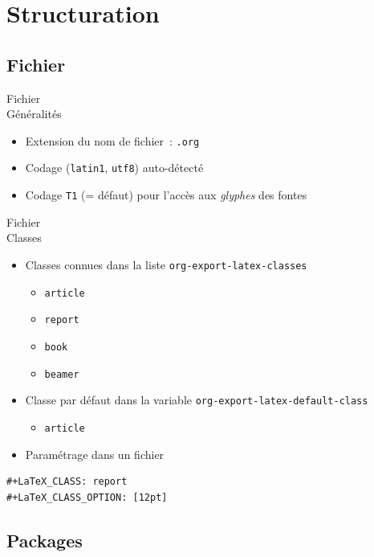 \documentclass[presentation,t,hideothersubsections]{beamer}
\begin{document}
\section{Structuration}
\label{sec-2}

\subsection{Fichier}
\label{sec-2-1}

\begin{frame}[fragile,label=sec-2-1-1]{Fichier \\ Généralités}
 \begin{itemize}
\item Extension du nom de fichier~: \texttt{.org}
\item Codage (\texttt{latin1}, \texttt{utf8}) auto-détecté
\item Codage \texttt{T1} (= défaut) pour l'accès aux \emph{glyphes} des fontes
\end{itemize}
\end{frame}
\begin{frame}[fragile,label=sec-2-1-2]{Fichier \\ Classes}
 \begin{itemize}
\item Classes connues dans la liste \texttt{org-export-latex-classes}
\begin{itemize}
\item \texttt{article}
\item \texttt{report}
\item \texttt{book}
\item \texttt{beamer}
\end{itemize}

\item Classe par défaut dans la variable \texttt{org-export-latex-default-class}
\begin{itemize}
\item \texttt{article}
\end{itemize}

\item Paramétrage dans un fichier
\end{itemize}

\lstset{language=org,numbers=none}
\begin{lstlisting}
#+LaTeX_CLASS: report
#+LaTeX_CLASS_OPTION: [12pt]
\end{lstlisting}
\end{frame}
\subsection{Packages}
\label{sec-2-2}
\end{document}
